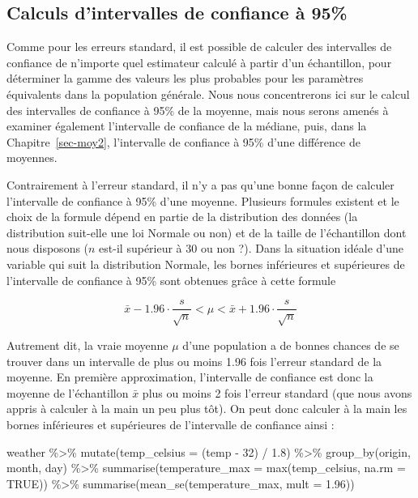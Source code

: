 \documentclass[
  a4paper,
  DIV=11,
  numbers=noendperiod,
  oneside]{scrreprt}
\newenvironment{Shaded}{}{}
\newcommand{\AttributeTok}[1]{\textcolor[rgb]{0.84,0.23,0.29}{#1}}
\newcommand{\ConstantTok}[1]{\textcolor[rgb]{0.00,0.36,0.77}{#1}}
\newcommand{\DecValTok}[1]{\textcolor[rgb]{0.00,0.36,0.77}{#1}}
\newcommand{\FloatTok}[1]{\textcolor[rgb]{0.00,0.36,0.77}{#1}}
\newcommand{\FunctionTok}[1]{\textcolor[rgb]{0.44,0.26,0.76}{#1}}
\newcommand{\NormalTok}[1]{\textcolor[rgb]{0.14,0.16,0.18}{#1}}
\newcommand{\SpecialCharTok}[1]{\textcolor[rgb]{0.00,0.36,0.77}{#1}}
\begin{document}
\hypertarget{calculs-dintervalles-de-confiance-uxe0-95}{%
\subsection{Calculs d'intervalles de confiance à
95\%}\label{calculs-dintervalles-de-confiance-uxe0-95}}

Comme pour les erreurs standard, il est possible de calculer des
intervalles de confiance de n'importe quel estimateur calculé à partir
d'un échantillon, pour déterminer la gamme des valeurs les plus
probables pour les paramètres équivalents dans la population générale.
Nous nous concentrerons ici sur le calcul des intervalles de confiance à
95\% de la moyenne, mais nous serons amenés à examiner également
l'intervalle de confiance de la médiane, puis, dans la
Chapitre~\ref{sec-moy2}, l'intervalle de confiance à 95\% d'une
différence de moyennes.

Contrairement à l'erreur standard, il n'y a pas qu'une bonne façon de
calculer l'intervalle de confiance à 95\% d'une moyenne. Plusieurs
formules existent et le choix de la formule dépend en partie de la
distribution des données (la distribution suit-elle une loi Normale ou
non) et de la taille de l'échantillon dont nous disposons (\(n\) est-il
supérieur à 30 ou non ?). Dans la situation idéale d'une variable qui
suit la distribution Normale, les bornes inférieures et supérieures de
l'intervalle de confiance à 95\% sont obtenues grâce à cette formule

\[\bar{x} - 1.96 \cdot \frac{s}{\sqrt{n}} < \mu < \bar{x} + 1.96 \cdot \frac{s}{\sqrt{n}}\]

Autrement dit, la vraie moyenne \(\mu\) d'une population a de bonnes
chances de se trouver dans un intervalle de plus ou moins 1.96 fois
l'erreur standard de la moyenne. En première approximation, l'intervalle
de confiance est donc la moyenne de l'échantillon \(\bar{x}\) plus ou
moins 2 fois l'erreur standard (que nous avons appris à calculer à la
main un peu plus tôt). On peut donc calculer à la main les bornes
inférieures et supérieures de l'intervalle de confiance ainsi :

\begin{Shaded}
\begin{Highlighting}[]
\NormalTok{weather }\SpecialCharTok{\%\textgreater{}\%} 
  \FunctionTok{mutate}\NormalTok{(}\AttributeTok{temp\_celsius =}\NormalTok{ (temp }\SpecialCharTok{{-}} \DecValTok{32}\NormalTok{) }\SpecialCharTok{/} \FloatTok{1.8}\NormalTok{) }\SpecialCharTok{\%\textgreater{}\%} 
  \FunctionTok{group\_by}\NormalTok{(origin, month, day) }\SpecialCharTok{\%\textgreater{}\%} 
  \FunctionTok{summarise}\NormalTok{(}\AttributeTok{temperature\_max =} \FunctionTok{max}\NormalTok{(temp\_celsius, }\AttributeTok{na.rm =} \ConstantTok{TRUE}\NormalTok{)) }\SpecialCharTok{\%\textgreater{}\%} 
  \FunctionTok{summarise}\NormalTok{(}\FunctionTok{mean\_se}\NormalTok{(temperature\_max, }\AttributeTok{mult =} \FloatTok{1.96}\NormalTok{))}
\end{Highlighting}
\end{Shaded}
\end{document}
